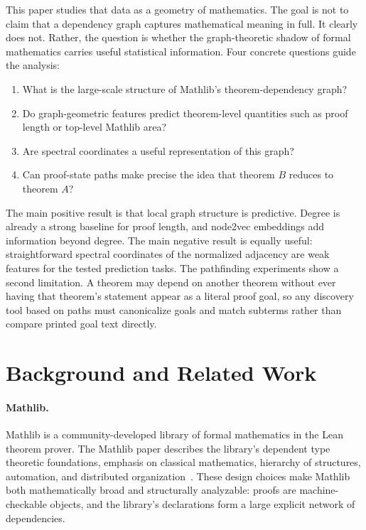 \documentclass[11pt]{article}
\begin{document}
This paper studies that data as a geometry of mathematics. The goal is not to
claim that a dependency graph captures mathematical meaning in full. It clearly
does not. Rather, the question is whether the graph-theoretic shadow of formal
mathematics carries useful statistical information. Four concrete questions
guide the analysis:
\begin{enumerate}
\item What is the large-scale structure of Mathlib's theorem-dependency graph?
\item Do graph-geometric features predict theorem-level quantities such as
proof length or top-level Mathlib area?
\item Are spectral coordinates a useful representation of this graph?
\item Can proof-state paths make precise the idea that theorem $B$ reduces to
theorem $A$?
\end{enumerate}

The main positive result is that local graph structure is predictive. Degree is
already a strong baseline for proof length, and node2vec embeddings add
information beyond degree. The main negative result is equally useful:
straightforward spectral coordinates of the normalized adjacency are weak
features for the tested prediction tasks. The pathfinding experiments show a
second limitation. A theorem may depend on another theorem without ever having
that theorem's statement appear as a literal proof goal, so any discovery tool
based on paths must canonicalize goals and match subterms rather than compare
printed goal text directly.

\section{Background and Related Work}

\paragraph{Mathlib.}
Mathlib is a community-developed library of formal mathematics in the Lean
theorem prover. The Mathlib paper describes the library's dependent type
theoretic foundations, emphasis on classical mathematics, hierarchy of
structures, automation, and distributed organization~\cite{mathlib}. These
design choices make Mathlib both mathematically broad and structurally
analyzable: proofs are machine-checkable objects, and the library's
declarations form a large explicit network of dependencies.
\end{document}
